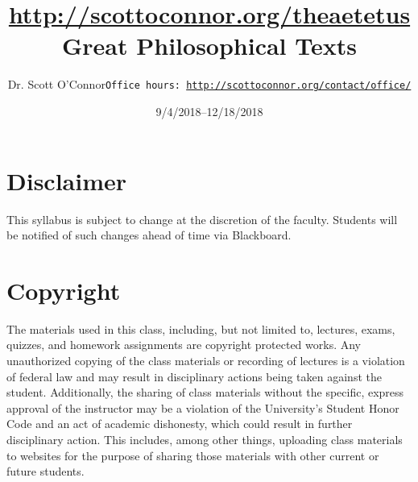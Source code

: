 \documentclass[article,oneside]{memoir}
\def\myauthor{Author}
\def\mytitle{Title}
\def\mycopyright{\myauthor}
\def\myweb{\href{http://scottoconnor.org/theaetetus}{http://scottoconnor.org/theaetetus}}
\def\myauthor{Dr. Scott O'Connor}
\def\mytitle{{\normalsize \myweb \newline} \HUGE Great Philosophical Texts}
\begin{document}
\setsansfont[Mapping=tex-text]{Myriad Pro} 
\setmonofont[Mapping=tex-text,Scale=0.8]{Georgia} 

\def\ind{\hangindent=1 true cm\hangafter=1 \noindent}
\def\labelitemi{$\cdot$}


\title{\LARGE \mytitle}     
\author{\Large\myauthor \newline \footnotesize\texttt{\noindent Office hours: \href{http://scottoconnor.org/contact/office/}{http://scottoconnor.org/contact/office/}}}
\date{9/4/2018--12/18/2018}


\maketitle




%
%


\section{Disclaimer}
 This syllabus is subject to change at the discretion of the faculty. Students will be notified of such changes ahead of time via Blackboard. 

\section{Copyright}
The materials used in this class, including, but not limited to, lectures, exams, quizzes, and homework assignments are copyright protected works.  Any unauthorized copying of the class materials or recording of lectures is a violation of federal law and may result in disciplinary actions being taken against the student.  Additionally, the sharing of class materials without the specific, express approval of the instructor may be a violation of the University's Student Honor Code and an act of academic dishonesty, which could result in further disciplinary action.  This includes, among other things, uploading class materials to websites for the purpose of sharing those materials with other current or future students. 
\end{document}
